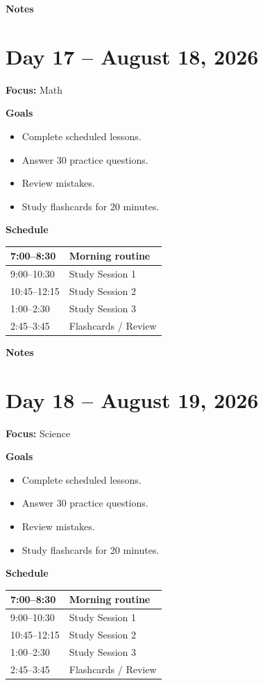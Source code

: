 \vspace{1em}
\textbf{Notes}

\vspace{8cm}

\newpage

\section*{Day 17 -- August 18, 2026}
\textbf{Focus:} Math

\textbf{Goals}
\begin{itemize}
\item Complete scheduled lessons.
\item Answer 30 practice questions.
\item Review mistakes.
\item Study flashcards for 20 minutes.
\end{itemize}

\textbf{Schedule}
\begin{tabular}{|p{4cm}|p{10cm}|}\hline
7:00--8:30 & Morning routine \\\hline
9:00--10:30 & Study Session 1 \\\hline
10:45--12:15 & Study Session 2 \\\hline
1:00--2:30 & Study Session 3 \\\hline
2:45--3:45 & Flashcards / Review \\\hline
\end{tabular}

\vspace{1em}
\textbf{Notes}

\vspace{8cm}

\newpage

\section*{Day 18 -- August 19, 2026}
\textbf{Focus:} Science

\textbf{Goals}
\begin{itemize}
\item Complete scheduled lessons.
\item Answer 30 practice questions.
\item Review mistakes.
\item Study flashcards for 20 minutes.
\end{itemize}

\textbf{Schedule}
\begin{tabular}{|p{4cm}|p{10cm}|}\hline
7:00--8:30 & Morning routine \\\hline
9:00--10:30 & Study Session 1 \\\hline
10:45--12:15 & Study Session 2 \\\hline
1:00--2:30 & Study Session 3 \\\hline
2:45--3:45 & Flashcards / Review \\\hline
\end{tabular}

